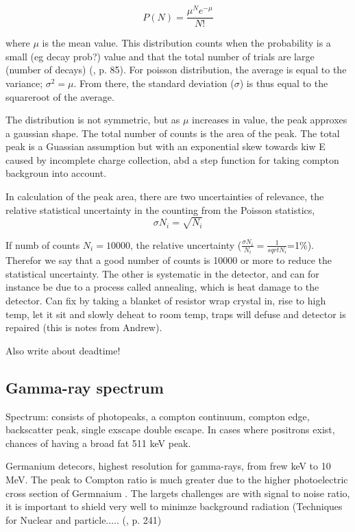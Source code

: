 \begin{equation}
    P(N) = \frac{\mu^N e^{-\mu}}{N!}
\end{equation}

where $\mu$ is the mean value. This distribution counts when the probability is a small (eg decay prob?) value and that the total number of trials are large (number of decays) (\cite{Leo1994}, p. 85).  For poisson distribution, the average is equal to the variance; $\sigma^2=\mu$. From there, the standard deviation ($\sigma$) is thus equal to the squareroot of the average. 

The distribution is not symmetric, but as $\mu$ increases in value, the peak approxes a gaussian shape. The total number of counts is the area of the peak. The total peak is a Guassian assumption but with an exponential skew towards kiw E caused by incomplete charge collection, abd a step function for taking compton backgroun into account. 

In calculation of the peak area, there are two uncertainties of relevance, the relative statistical uncertainty in the counting from the Poisson statistics, 
\begin{equation}
\sigma N_i = \sqrt{N_i}
\end{equation}

If numb of counts $N_i =10000$, the relative uncertainty ($\frac{\sigma N_i }{N_i}= \frac{1}{{sqrt{N_i}}}$=1\%). Therefor we say that a good number of counts is 10000 or more to reduce the statistical uncertainty. The other is systematic in the detector, and can for instance be due to a process called annealing, which is heat damage to the detector. Can fix by taking a blanket of resistor wrap crystal in, rise to high temp, let it sit and slowly deheat to room temp, traps will defuse and detector is repaired (this is notes from Andrew).

Also write about deadtime! 
\subsection{Gamma-ray spectrum}

Spectrum: consists of photopeaks, a compton continuum, compton edge, backscatter peak, single exscape double escape. In cases where positrons exist, chances of having a broad fat 511 keV peak. 

Germanium detecors, highest resolution for gamma-rays, from frew keV to 10 MeV. The peak to Compton ratio is much greater due to the higher photoelectric cross section of Germnaium . The largets challenges are with signal to noise ratio, it is important to shield very well to minimze background radiation (Techniques for Nuclear and particle..... (\cite{Leo1994}, p. 241) \\

